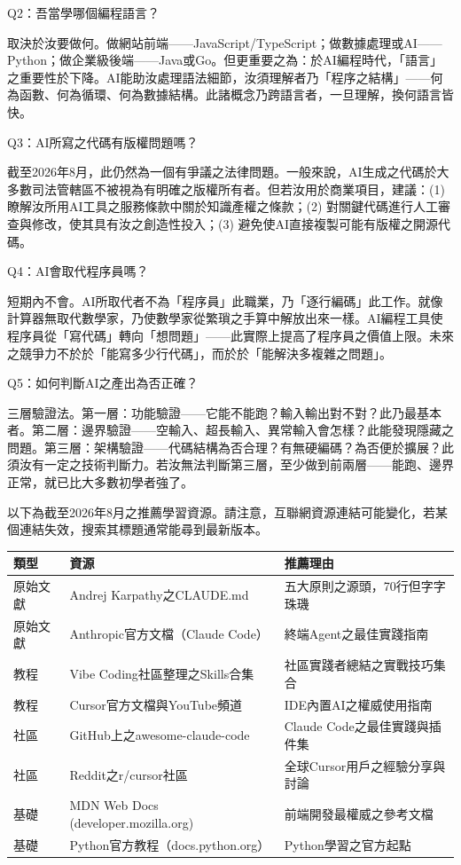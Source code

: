 Q2：吾當學哪個編程語言？

取決於汝要做何。做網站前端——JavaScript/TypeScript；做數據處理或AI——Python；做企業級後端——Java或Go。但更重要之為：於AI編程時代，「語言」之重要性於下降。AI能助汝處理語法細節，汝須理解者乃「程序之結構」——何為函數、何為循環、何為數據結構。此諸概念乃跨語言者，一旦理解，換何語言皆快。

Q3：AI所寫之代碼有版權問題嗎？

截至2026年8月，此仍然為一個有爭議之法律問題。一般來說，AI生成之代碼於大多數司法管轄區不被視為有明確之版權所有者。但若汝用於商業項目，建議：(1) 瞭解汝所用AI工具之服務條款中關於知識產權之條款；(2) 對關鍵代碼進行人工審查與修改，使其具有汝之創造性投入；(3) 避免使AI直接複製可能有版權之開源代碼。

Q4：AI會取代程序員嗎？

短期內不會。AI所取代者不為「程序員」此職業，乃「逐行編碼」此工作。就像計算器無取代數學家，乃使數學家從繁瑣之手算中解放出來一樣。AI編程工具使程序員從「寫代碼」轉向「想問題」——此實際上提高了程序員之價值上限。未來之競爭力不於於「能寫多少行代碼」，而於於「能解決多複雜之問題」。

Q5：如何判斷AI之產出為否正確？

三層驗證法。第一層：功能驗證——它能不能跑？輸入輸出對不對？此乃最基本者。第二層：邊界驗證——空輸入、超長輸入、異常輸入會怎樣？此能發現隱藏之問題。第三層：架構驗證——代碼結構為否合理？有無硬編碼？為否便於擴展？此須汝有一定之技術判斷力。若汝無法判斷第三層，至少做到前兩層——能跑、邊界正常，就已比大多數初學者強了。


以下為截至2026年8月之推薦學習資源。請注意，互聯網資源連結可能變化，若某個連結失效，搜索其標題通常能尋到最新版本。

\begin{center}
\begin{tabularx}{\linewidth}{|X|X|X|}
\hline
\textbf{類型} & \textbf{資源} & \textbf{推薦理由} \tabularnewline
\hline
原始文獻 & Andrej Karpathy之CLAUDE.md & 五大原則之源頭，70行但字字珠璣 \tabularnewline
原始文獻 & Anthropic官方文檔（Claude Code） & 終端Agent之最佳實踐指南 \tabularnewline
教程 & Vibe Coding社區整理之Skills合集 & 社區實踐者總結之實戰技巧集合 \tabularnewline
教程 & Cursor官方文檔與YouTube頻道 & IDE內置AI之權威使用指南 \tabularnewline
社區 & GitHub上之awesome-claude-code & Claude Code之最佳實踐與插件集 \tabularnewline
社區 & Reddit之r/cursor社區 & 全球Cursor用戶之經驗分享與討論 \tabularnewline
基礎 & MDN Web Docs (developer.mozilla.org) & 前端開發最權威之參考文檔 \tabularnewline
基礎 & Python官方教程（docs.python.org） & Python學習之官方起點 \tabularnewline
\hline
\end{tabularx}
\end{center}

